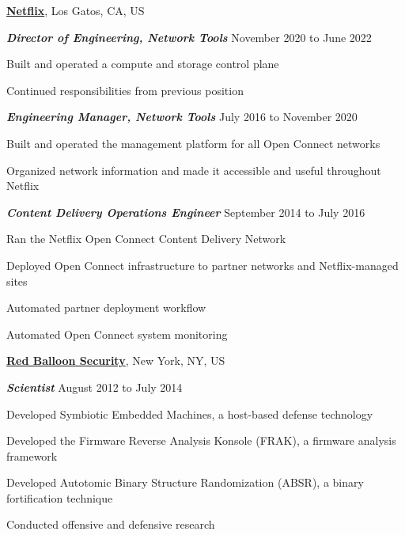 \documentclass[10pt]{article}
\newenvironment{outerlist}[1][\enskip\textbullet]%
        {\begin{itemize}[#1]}{\end{itemize}%
         \vspace{-.6\baselineskip}}
\newenvironment{innerlist}[1][\enskip\textbullet]%
        {\begin{compactitem}[#1]}{\end{compactitem}}
\newcommand{\blankline}{\quad\pagebreak[2]}
\begin{document}
\href{https://openconnect.netflix.com}{\textbf{Netflix}},
Los Gatos, CA, US
\begin{outerlist}
\item[] \textit{\textbf{Director of Engineering, Network Tools}}
  \hfill November 2020 to June 2022
  \begin{innerlist}
  \item Built and operated a compute and storage control plane
  \item Continued responsibilities from previous position
  \end{innerlist}

\item[] \textit{\textbf{Engineering Manager, Network Tools}}
  \hfill July 2016 to November 2020
  \begin{innerlist}
  \item Built and operated the management platform for all Open Connect networks
  \item Organized network information and made it accessible and useful throughout Netflix
  \end{innerlist}

\item[] \textit{\textbf{Content Delivery Operations Engineer}}
  \hfill September 2014 to July 2016
  \begin{innerlist}
  \item Ran the Netflix Open Connect Content Delivery Network
  \item Deployed Open Connect infrastructure to partner networks and Netflix-managed sites
  \item Automated partner deployment workflow
  \item Automated Open Connect system monitoring
  \end{innerlist}
\end{outerlist}

\blankline

\href{https://redballoonsecurity.com}{\textbf{Red Balloon Security}},
New York, NY, US
\begin{outerlist}
\item[] \textit{\textbf{Scientist}}
  \hfill August 2012 to July 2014
  \begin{innerlist}
  \item Developed Symbiotic Embedded Machines, a host-based defense technology
  \item Developed the Firmware Reverse Analysis Konsole (FRAK), a firmware analysis framework
  \item Developed Autotomic Binary Structure Randomization (ABSR), a binary fortification technique
  \item Conducted offensive and defensive research
  \end{innerlist}
\end{outerlist}
\end{document}
